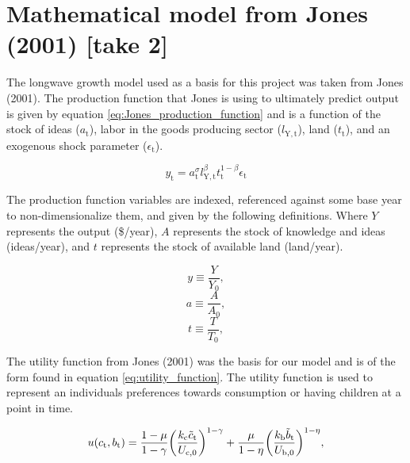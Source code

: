 \documentclass[letterpaper,12pt]{article}
\begin{document}

\section{Mathematical model from Jones (2001) [take 2]}
The longwave growth model used as a basis for this project was taken from Jones (2001). The production function that Jones is using to ultimately predict output is given by equation \ref{eq:Jones_production_function} and is a function of the stock of ideas ($a_\mathrm{t}$), labor in the goods producing sector ($l_\mathrm{Y,t}$), land ($t_\mathrm{t}$), and an exogenous shock parameter ($\epsilon_\mathrm{t}$).

\begin{equation} \label{eq:Jones_production_function}
y_\mathrm{t} = a_\mathrm{t} ^\sigma l_\mathrm{Y,t} ^\beta t_\mathrm{t} ^{1-\beta} \epsilon_\mathrm{t}
\end{equation}

The production function variables are indexed, referenced against some base year to non-dimensionalize them, and given by the following definitions. Where $Y$ represents the output (\$/year), $A$ represents the stock of knowledge and ideas (ideas/year), and $t$ represents the stock of available land (land/year).

\begin{equation} \label{eq:index_y}
y \equiv \frac{Y}{Y_\mathrm{0}},
\end{equation}
\begin{equation} \label{eq:index_a}
a \equiv \frac{A}{A_\mathrm{0}},
\end{equation}
\begin{equation} \label{eq:index_t}
t \equiv \frac{T}{T_\mathrm{0}},
\end{equation}


The utility function from Jones (2001) was the basis for our model and is of the form found in equation \ref{eq:utility_function}. The utility function is used to represent an individuals preferences towards consumption or having children at a point in time. 

\begin{equation} \label{eq:utility_function}
u(c_\mathrm{t}, b_\mathrm{t}) = \frac{1-\mu}{1-\gamma} \bigg{(}\frac{k_\mathrm{c} \tilde c_\mathrm{t}}{U_\mathrm{c,0}} \bigg{)}^{1-\gamma} + \frac{\mu}{1-\eta} \bigg{(}\frac{k_\mathrm{b} \tilde b_\mathrm{t}}{U_\mathrm{b,0}} \bigg{)}^{1-\eta},
\end{equation}
\end{document}

